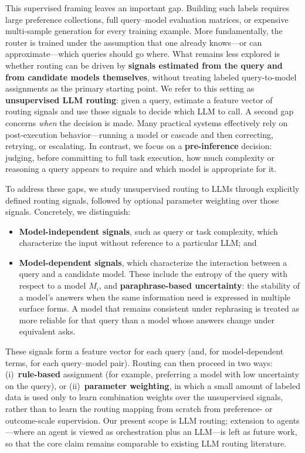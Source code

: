 This supervised framing leaves an important gap.
Building such labels requires large preference collections, full query--model evaluation matrices, or expensive multi-sample generation for every training example.
More fundamentally, the router is trained under the assumption that one already knows---or can approximate---which queries should go where.
What remains less explored is whether routing can be driven by \textbf{signals estimated from the query and from candidate models themselves}, without treating labeled query-to-model assignments as the primary starting point.
We refer to this setting as \textbf{unsupervised LLM routing}: given a query, estimate a feature vector of routing signals and use those signals to decide which LLM to call.
A second gap concerns \emph{when} the decision is made.
Many practical systems effectively rely on post-execution behavior---running a model or cascade and then correcting, retrying, or escalating.
In contrast, we focus on a \textbf{pre-inference} decision: judging, before committing to full task execution, how much complexity or reasoning a query appears to require and which model is appropriate for it.

To address these gaps, we study unsupervised routing to LLMs through explicitly defined routing signals, followed by optional parameter weighting over those signals.
Concretely, we distinguish:
\begin{itemize}
    \item \textbf{Model-independent signals}, such as query or task complexity, which characterize the input without reference to a particular LLM; and
    \item \textbf{Model-dependent signals}, which characterize the interaction between a query and a candidate model.
    These include the entropy of the query with respect to a model $M_i$, and \textbf{paraphrase-based uncertainty}: the stability of a model's answers when the same information need is expressed in multiple surface forms.
    A model that remains consistent under rephrasing is treated as more reliable for that query than a model whose answers change under equivalent asks.
\end{itemize}
These signals form a feature vector for each query (and, for model-dependent terms, for each query--model pair).
Routing can then proceed in two ways: (i)~\textbf{rule-based} assignment (for example, preferring a model with low uncertainty on the query), or (ii)~\textbf{parameter weighting}, in which a small amount of labeled data is used only to learn combination weights over the unsupervised signals, rather than to learn the routing mapping from scratch from preference- or outcome-scale supervision.
Our present scope is LLM routing; extension to agents---where an agent is viewed as orchestration plus an LLM---is left as future work, so that the core claim remains comparable to existing LLM routing literature.


